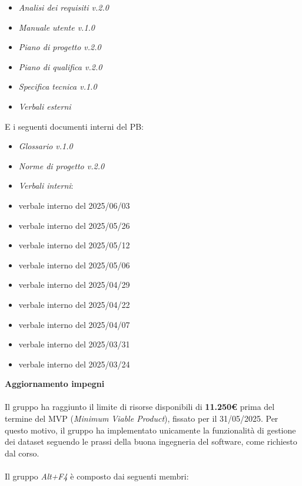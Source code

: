 \documentclass[a4paper, 12pt]{article}
\begin{document}
\begin{itemize}
    \item \textit{Analisi dei requisiti v.2.0}
    \item \textit{Manuale utente v.1.0}
    \item \textit{Piano di progetto v.2.0}
    \item \textit{Piano di qualifica v.2.0}
    \item \textit{Specifica tecnica v.1.0}
    \item \textit{Verbali esterni}
\end{itemize}
\noindent
E i seguenti documenti interni del PB:
\begin{itemize}
    \item \textit{Glossario v.1.0}
    \item \textit{Norme di progetto v.2.0}
    \item \textit{Verbali interni}:
    \item verbale interno del 2025/06/03
    \item verbale interno del 2025/05/26
    \item verbale interno del 2025/05/12
    \item verbale interno del 2025/05/06
    \item verbale interno del 2025/04/29
    \item verbale interno del 2025/04/22
    \item verbale interno del 2025/04/07
    \item verbale interno del 2025/03/31
    \item verbale interno del 2025/03/24
\end{itemize}
\vspace{0.75cm} 
\noindent
\textbf{Aggiornamento impegni}\\
\\
Il gruppo ha raggiunto il limite di risorse disponibili di \textbf{11.250€} prima del termine del MVP (\textit{Minimum Viable Product}), fissato per il 31/05/2025. Per questo motivo, il gruppo ha implementato unicamente la funzionalità di gestione dei dataset seguendo le prassi della buona ingegneria del software, come richiesto dal corso.\\
\vspace{0.75cm} 
\\
\noindent
Il gruppo \textit{Alt+F4} è composto dai seguenti membri:
\end{document}
